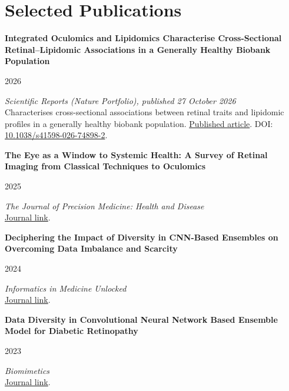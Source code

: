\documentclass[11pt,a4paper]{article}
\newcommand{\paper}[4]{
  \textbf{#1}\par
  {\small\color{cvmuted}#2}\par
  \emph{#3}\\
  {\small #4}\par\vspace{0.36em}
}
\begin{document}
\section*{Selected Publications}
\paper
{Integrated Oculomics and Lipidomics Characterise Cross-Sectional Retinal--Lipidomic Associations in a Generally Healthy Biobank Population}
{2026}
{Scientific Reports (Nature Portfolio), published 27 October 2026}
{Characterises cross-sectional associations between retinal traits and lipidomic profiles in a generally healthy biobank population. \href{https://www.nature.com/articles/s41598-026-74898-2}{Published article}. DOI: \href{https://doi.org/10.1038/s41598-026-74898-2}{10.1038/s41598-026-74898-2}.}

\paper
{The Eye as a Window to Systemic Health: A Survey of Retinal Imaging from Classical Techniques to Oculomics}
{2025}
{The Journal of Precision Medicine: Health and Disease}
{\href{https://www.sciencedirect.com/science/article/pii/S305063282500023X}{Journal link}.}

\paper
{Deciphering the Impact of Diversity in CNN-Based Ensembles on Overcoming Data Imbalance and Scarcity}
{2024}
{Informatics in Medicine Unlocked}
{\href{https://www.sciencedirect.com/science/article/pii/S2352914824001138}{Journal link}.}

\paper
{Data Diversity in Convolutional Neural Network Based Ensemble Model for Diabetic Retinopathy}
{2023}
{Biomimetics}
{\href{https://www.mdpi.com/2313-7673/8/2/187}{Journal link}.}
\end{document}
